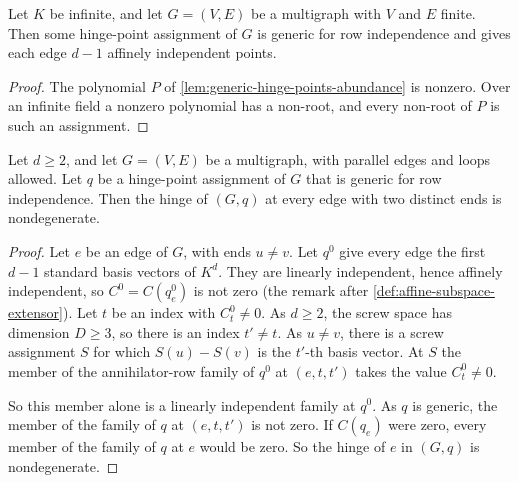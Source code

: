 \begin{lemma}
  \label{lem:exists-generic-hinge-points}
  \leanok
  Let $K$ be infinite, and let $G = (V, E)$ be a multigraph with $V$
  and $E$ finite. Then some hinge-point assignment of $G$ is generic
  for row independence and gives each edge $d - 1$ affinely
  independent points.
\end{lemma}
\begin{proof}
  \leanok
  The polynomial $P$ of \cref{lem:generic-hinge-points-abundance} is
  nonzero. Over an infinite field a nonzero polynomial has a non-root,
  and every non-root of $P$ is such an assignment.
\end{proof}

\begin{lemma}
  \label{lem:generic-hinge-points-nondegenerate}
  \leanok
  Let $d \ge 2$, and let $G = (V, E)$ be a multigraph, with parallel
  edges and loops allowed. Let $q$ be a hinge-point assignment of $G$
  that is generic for row independence. Then the hinge of $(G, q)$ at
  every edge with two distinct ends is nondegenerate.
\end{lemma}
\begin{proof}
  \leanok
  Let $e$ be an edge of $G$, with ends $u \neq v$. Let $q^0$ give every
  edge the first $d - 1$ standard basis vectors of $K^d$. They are
  linearly independent, hence affinely independent, so
  $C^0 = C(q^0_e)$ is not zero (the remark after
  \cref{def:affine-subspace-extensor}). Let $t$ be an index with
  $C^0_t \neq 0$. As $d \ge 2$, the screw space has dimension
  $D \ge 3$, so there is an index $t' \neq t$. As $u \neq v$, there is
  a screw assignment $S$ for which $S(u) - S(v)$ is the $t'$-th basis
  vector. At $S$ the member of the annihilator-row family of $q^0$ at
  $(e, t, t')$ takes the value $C^0_t \neq 0$.

  So this member alone is a linearly independent family at $q^0$. As
  $q$ is generic, the member of the family of $q$ at $(e, t, t')$ is
  not zero. If $C(q_e)$ were zero, every member of the family of $q$
  at $e$ would be zero. So the hinge of $e$ in $(G, q)$ is
  nondegenerate.
\end{proof}

